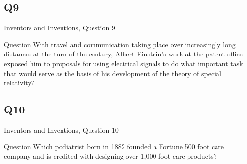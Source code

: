 \documentclass[11pt]{beamer}
\begin{document}
\subsection*{Q9}
\begin{frame}[t]{Inventors and Inventions, Question 9}
\begin{block}{Question}
With travel and communication taking place over increasingly long distances at the turn of the century, Albert Einstein's work at the patent office exposed him to proposals for using electrical signals to do what important task that would serve as the basis of his development of the theory of special relativity?
\end{block}
\end{frame}
\subsection*{Q10}
\begin{frame}[t]{Inventors and Inventions, Question 10}
\begin{block}{Question}
Which podiatrist born in 1882 founded a Fortune 500 foot care company and is credited with designing over 1,000 foot care products?
\end{block}
\end{frame}
\end{document}
